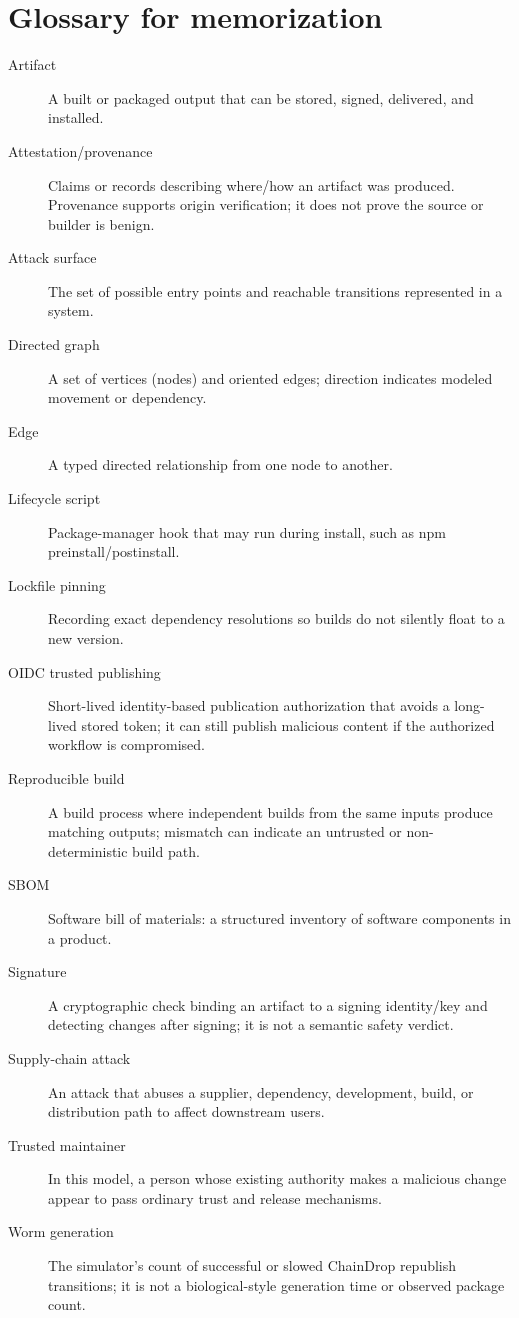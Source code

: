 \documentclass[11pt,oneside]{book}
\begin{document}
\chapter{Glossary for memorization}
\begin{description}
\item[Artifact] A built or packaged output that can be stored, signed, delivered, and installed.
\item[Attestation/provenance] Claims or records describing where/how an artifact was produced. Provenance supports origin verification; it does not prove the source or builder is benign.
\item[Attack surface] The set of possible entry points and reachable transitions represented in a system.
\item[Directed graph] A set of vertices (nodes) and oriented edges; direction indicates modeled movement or dependency.
\item[Edge] A typed directed relationship from one node to another.
\item[Lifecycle script] Package-manager hook that may run during install, such as npm preinstall/postinstall.
\item[Lockfile pinning] Recording exact dependency resolutions so builds do not silently float to a new version.
\item[OIDC trusted publishing] Short-lived identity-based publication authorization that avoids a long-lived stored token; it can still publish malicious content if the authorized workflow is compromised.
\item[Reproducible build] A build process where independent builds from the same inputs produce matching outputs; mismatch can indicate an untrusted or non-deterministic build path.
\item[SBOM] Software bill of materials: a structured inventory of software components in a product.
\item[Signature] A cryptographic check binding an artifact to a signing identity/key and detecting changes after signing; it is not a semantic safety verdict.
\item[Supply-chain attack] An attack that abuses a supplier, dependency, development, build, or distribution path to affect downstream users.
\item[Trusted maintainer] In this model, a person whose existing authority makes a malicious change appear to pass ordinary trust and release mechanisms.
\item[Worm generation] The simulator's count of successful or slowed ChainDrop republish transitions; it is not a biological-style generation time or observed package count.
\end{description}
\end{document}
